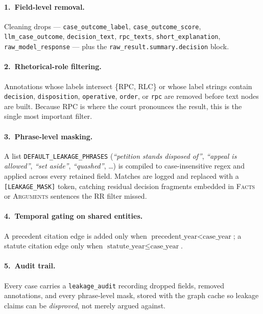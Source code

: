 \begin{sloppypar}
\paragraph{1.\ Field-level removal.} Cleaning drops  --- \texttt{case\_outcome\_label}, \texttt{case\_outcome\_score}, \texttt{llm\_case\_outcome}, \texttt{decision\_text}, \texttt{rpc\_texts}, \texttt{short\_explanation}, \texttt{raw\_model\_response} --- plus the \texttt{raw\_result.summary.decision} block.

\paragraph{2.\ Rhetorical-role filtering.} Annotations whose labels intersect \{\textsc{RPC}, \textsc{RLC}\} or whose label strings contain \texttt{decision}, \texttt{disposition}, \texttt{operative}, \texttt{order}, or \texttt{rpc} are removed before text nodes are built. Because \textsc{RPC} is where the court pronounces the result, this is the single most important filter.

\paragraph{3.\ Phrase-level masking.} A list \texttt{DEFAULT\_LEAKAGE\_PHRASES} (\emph{``petition stands disposed of''}, \emph{``appeal is allowed''}, \emph{``set aside''}, \emph{``quashed''}, \dots) is compiled to case-insensitive regex and applied across every retained field. Matches are logged and replaced with a \texttt{[LEAKAGE\_MASK]} token, catching residual decision fragments embedded in \textsc{Facts} or \textsc{Arguments} sentences the RR filter missed.

\paragraph{4.\ Temporal gating on shared entities.} A precedent citation edge is added only when $\text{precedent\_year} < \text{case\_year}$; a statute citation edge only when $\text{statute\_year} \leq \text{case\_year}$.

\paragraph{5.\ Audit trail.} Every case carries a \texttt{leakage\_audit} recording dropped fields, removed annotations, and every phrase-level mask, stored with the graph cache so leakage claims can be \emph{disproved}, not merely argued against.
\end{sloppypar}

